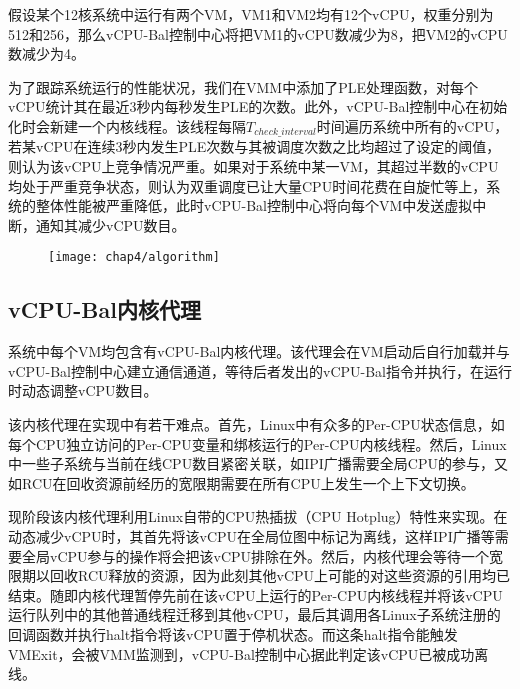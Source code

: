 假设某个12核系统中运行有两个VM，VM1和VM2均有12个vCPU，权重分别为512和256，那么vCPU-Bal控制中心将把VM1的vCPU数减少为8，把VM2的vCPU数减少为4。

为了跟踪系统运行的性能状况，我们在VMM中添加了PLE处理函数，对每个vCPU统计其在最近3秒内每秒发生PLE的次数。此外，vCPU-Bal控制中心在初始化时会新建一个内核线程。该线程每隔$T_{check\_interval}$时间遍历系统中所有的vCPU，若某vCPU在连续3秒内发生PLE次数与其被调度次数之比均超过了设定的阈值，则认为该vCPU上竞争情况严重。如果对于系统中某一VM，其超过半数的vCPU均处于严重竞争状态，则认为双重调度已让大量CPU时间花费在自旋忙等上，系统的整体性能被严重降低，此时vCPU-Bal控制中心将向每个VM中发送虚拟中断，通知其减少vCPU数目。

\begin{figure}[!htp]
  \centering
  \texttt{[image: chap4/algorithm]}
\end{figure}

\subsection{vCPU-Bal内核代理}

系统中每个VM均包含有vCPU-Bal内核代理。该代理会在VM启动后自行加载并与vCPU-Bal控制中心建立通信通道，等待后者发出的vCPU-Bal指令并执行，在运行时动态调整vCPU数目。

该内核代理在实现中有若干难点。首先，Linux中有众多的Per-CPU状态信息，如每个CPU独立访问的Per-CPU变量和绑核运行的Per-CPU内核线程。然后，Linux中一些子系统与当前在线CPU数目紧密关联，如IPI广播需要全局CPU的参与，又如RCU\cite{mckenney1998read}在回收资源前经历的宽限期需要在所有CPU上发生一个上下文切换。

现阶段该内核代理利用Linux自带的CPU热插拔（CPU Hotplug）特性\cite{mwaikambo2004linux}来实现。在动态减少vCPU时，其首先将该vCPU在全局位图中标记为离线，这样IPI广播等需要全局vCPU参与的操作将会把该vCPU排除在外。然后，内核代理会等待一个宽限期以回收RCU释放的资源，因为此刻其他vCPU上可能的对这些资源的引用均已结束。随即内核代理暂停先前在该vCPU上运行的Per-CPU内核线程并将该vCPU运行队列中的其他普通线程迁移到其他vCPU，最后其调用各Linux子系统注册的回调函数并执行halt指令将该vCPU置于停机状态。而这条halt指令能触发VMExit\cite{guide2010intel}，会被VMM监测到，vCPU-Bal控制中心据此判定该vCPU已被成功离线。

